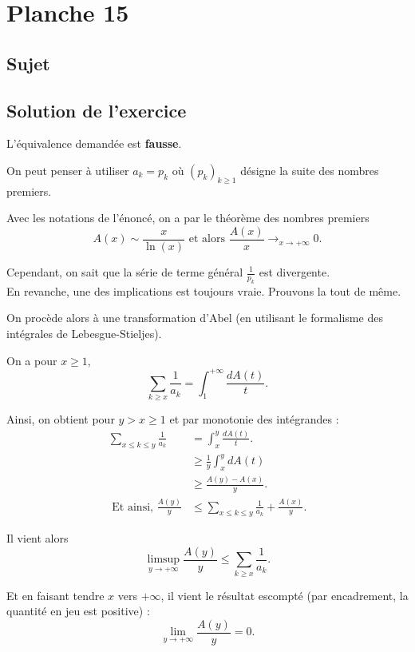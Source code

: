\chapter{Planche 15}

\section{Sujet}

\section{Solution de l'exercice}

L'équivalence demandée est \textbf{fausse}. 

On peut penser à utiliser $a_{k}=p_{k}$ où $\displaystyle (p_{k})_{k\geq 1}$ désigne la suite des nombres premiers.

Avec les notations de l'énoncé, on a par le théorème des nombres premiers $$A(x)\sim \frac{x}{\ln(x)} \mbox{ et alors } \frac{A(x)}{x}\longrightarrow_{x\rightarrow +\infty} 0.$$

Cependant, on sait que la série de terme général $\displaystyle \frac{1}{p_{k}}$ est divergente.\\

En revanche, une des implications est toujours vraie. Prouvons la tout de même.

On procède alors à une transformation d'Abel (en utilisant le formalisme des intégrales de Lebesgue-Stieljes).

On a pour $x\geq 1,$
$$\sum_{k\geq x}\frac{1}{a_{k}} = \int_{1}^{+\infty}\frac{dA(t)}{t}.$$

Ainsi, on obtient pour $y>x\geq 1$ et par monotonie des intégrandes :
\begin{align*} 
\sum_{x\leq k\leq y}\frac{1}{a_{k}} & =\int_{x}^{y}\frac{dA(t)}{t}.\\
& \geq \frac{1}{y}\int_{x}^{y}dA(t)\\
& \geq \frac{A(y)-A(x)}{y}.\\
\mbox{ Et ainsi, } \frac{A(y)}{y} & \leq \sum_{x\leq k\leq y}\frac{1}{a_{k}}+ \frac{A(x)}{y}.
\end{align*}

Il vient alors $$\limsup_{y\rightarrow +\infty}\frac{A(y)}{y} \leq \sum_{k\geq x}\frac{1}{a_{k}}.$$

Et en faisant tendre $x$ vers $+\infty$, il vient le résultat escompté (par encadrement, la quantité en jeu est positive) : $$\lim_{y\rightarrow +\infty}\frac{A(y)}{y}=0.$$